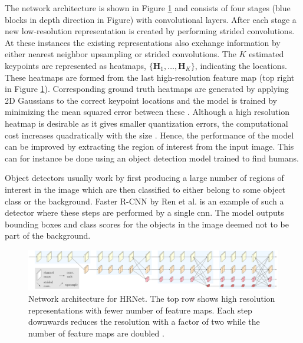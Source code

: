 The network architecture is shown in Figure \ref{fig:hrnet} and consists of four stages (blue blocks in depth direction in Figure) with convolutional layers. After each stage a new low-resolution representation is created by performing strided convolutions. At these instances the existing representations also exchange information by either nearest neighbor upsampling or strided convolutions. The $K$ estimated keypoints are represented as heatmaps, $\{\mathbf{H}_1, \hdots, \mathbf{H}_K\}$, indicating the locations. These heatmaps are formed from the last high-resolution feature map (top right in Figure \ref{fig:hrnet}). Corresponding ground truth heatmaps are generated by applying 2D Gaussians to the correct keypoint locations and the model is trained by minimizing the mean squared error between these \cite{Sun2019}. Although a high resolution heatmap is desirable as it gives smaller quantization errors, the computational cost increases quadratically with the size \cite{Zhang2020}. Hence, the performance of the model can be improved by extracting the region of interest from the input image. This can for instance be done using an object detection model trained to find humans.

Object detectors usually work by first producing a large number of regions of interest in the image which are then classified to either belong to some object class or the background. Faster R-CNN by Ren et al. \cite{Ren2017} is an example of such a detector where these steps are performed by a single \gls{cnn}. The model outputs bounding boxes and class scores for the objects in the image deemed not to be part of the background. %


\begin{figure}
 \centering
 \includegraphics[width=\textwidth]{files/figs/hpe/hrnet.png}
 \caption{Network architecture for HRNet. The top row shows high resolution representations with fewer number of feature maps. Each step downwards reduces the resolution with a factor of two while the number of feature maps are doubled \cite{Wang2020}.}
 \label{fig:hrnet}
\end{figure}

